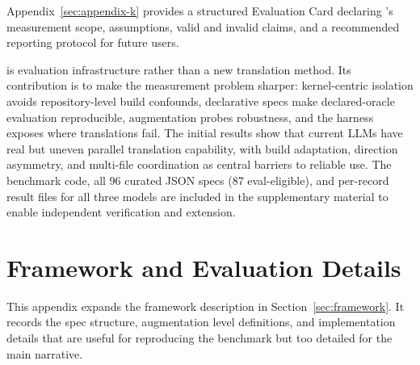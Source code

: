 




Appendix~\ref{sec:appendix-k} provides a structured Evaluation Card declaring \parbench{}'s measurement scope, assumptions, valid and invalid claims, and a recommended reporting protocol for future users. 

\parbench{} is evaluation infrastructure rather than a new translation method. Its contribution is to make the measurement problem sharper: kernel-centric isolation avoids repository-level build confounds, declarative specs make declared-oracle evaluation reproducible, augmentation probes robustness, and the harness exposes where translations fail. The initial results show that current LLMs have real but uneven parallel translation capability, with build adaptation, direction asymmetry, and multi-file coordination as central barriers to reliable use. The benchmark code, all 96 curated JSON specs (87 eval-eligible), and per-record result files for all three models are included in the supplementary material to enable independent verification and extension.

\section{Framework and Evaluation Details}
\label{sec:appendix-a}


This appendix expands the framework description in Section~\ref{sec:framework}. It records the spec structure, augmentation level definitions, and implementation details that are useful for reproducing the benchmark but too detailed for the main narrative.

